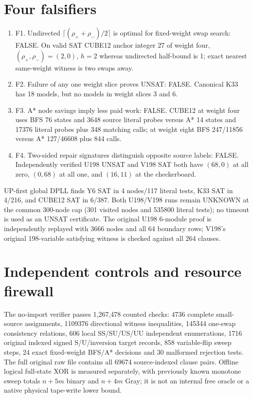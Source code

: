 \documentclass[11pt]{article}
\begin{document}
\section{Four falsifiers}
\begin{enumerate}
\item[] F1. Undirected $\lceil(\rho_++\rho_-)/2\rceil$ is optimal for fixed-weight swap search: FALSE. On valid SAT CUBE12 anchor integer 27 of weight four, $(\rho_+,\rho_-)=(2,0)$, $h=2$ whereas undirected half-bound is 1; exact nearest same-weight witness is two swaps away.
\item[] F2. Failure of any one weight slice proves UNSAT: FALSE. Canonical K33 has 18 models, but no models in weight slices 3 and 6.
\item[] F3. A* node savings imply less paid work: FALSE. CUBE12 at weight four uses BFS 76 states and 3648 source literal probes versus A* 14 states and 17376 literal probes plus 348 matching calls; at weight eight BFS 247/11856 versus A* 127/46608 plus 844 calls.
\item[] F4. Two-sided repair signatures distinguish opposite source labels: FALSE. Independently verified U198 UNSAT and V198 SAT both have $(68,0)$ at all zero, $(0,68)$ at all one, and $(16,11)$ at the checkerboard.
\end{enumerate}
UP-first global DPLL finds Y6 SAT in 4 nodes/117 literal tests, K33 SAT in 4/216, and CUBE12 SAT in 6/387. Both U198/V198 runs remain UNKNOWN at the common 300-node cap (301 visited nodes and 535800 literal tests); no timeout is used as an UNSAT certificate. The original U198 6-module proof is independently replayed with 3666 nodes and all 64 boundary rows; V198's original 198-variable satisfying witness is checked against all 264 clauses.

\section{Independent controls and resource firewall}
The no-import verifier passes 1,267,478 counted checks: 4736 complete small-source assignments, 1109376 directional witness inequalities, 145344 one-swap consistency relations, 606 local SS/SU/US/UU independent enumerations, 1716 original indexed signed S/U/inversion target records, 858 variable-flip sweep steps, 24 exact fixed-weight BFS/A* decisions and 30 malformed rejection tests. The full original raw file contains all 69674 source-indexed clause pairs. Offline logical full-state XOR is measured separately, with previously known monotone sweep totals $n+5m$ binary and $n+4m$ Gray; it is not an internal free oracle or a native physical tape-write lower bound.
\end{document}
